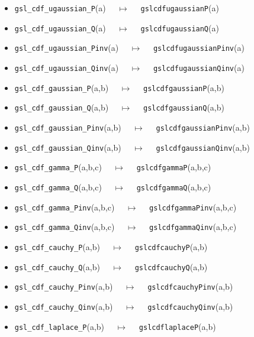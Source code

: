 \documentclass[a4paper,twoside,12pt]{book}
\begin{document}
{\small

\begin{itemize}
    \setlength{\itemsep}{0pt}%
    \setlength{\topsep}{0pt} 
    \setlength{\partopsep}{0pt}
    \setlength{\parsep}{0pt}
    \setlength{\parskip}{0pt}%

\item \texttt{gsl\_cdf\_ugaussian\_P}(a) $\quad \mapsto\quad $ \texttt{gslcdfugaussianP}(a) 
\item \texttt{gsl\_cdf\_ugaussian\_Q}(a) $\quad \mapsto\quad $ \texttt{gslcdfugaussianQ}(a) 
\item \texttt{gsl\_cdf\_ugaussian\_Pinv}(a) $\quad \mapsto\quad $ \texttt{gslcdfugaussianPinv}(a) 
\item \texttt{gsl\_cdf\_ugaussian\_Qinv}(a) $\quad \mapsto\quad $ \texttt{gslcdfugaussianQinv}(a) 
\item \texttt{gsl\_cdf\_gaussian\_P}(a,b) $\quad \mapsto\quad $ \texttt{gslcdfgaussianP}(a,b) 
\item \texttt{gsl\_cdf\_gaussian\_Q}(a,b) $\quad \mapsto\quad $ \texttt{gslcdfgaussianQ}(a,b) 
\item \texttt{gsl\_cdf\_gaussian\_Pinv}(a,b) $\quad \mapsto\quad $ \texttt{gslcdfgaussianPinv}(a,b) 
\item \texttt{gsl\_cdf\_gaussian\_Qinv}(a,b) $\quad \mapsto\quad $ \texttt{gslcdfgaussianQinv}(a,b) 
\item \texttt{gsl\_cdf\_gamma\_P}(a,b,c) $\quad \mapsto\quad $ \texttt{gslcdfgammaP}(a,b,c) 
\item \texttt{gsl\_cdf\_gamma\_Q}(a,b,c) $\quad \mapsto\quad $ \texttt{gslcdfgammaQ}(a,b,c) 
\item \texttt{gsl\_cdf\_gamma\_Pinv}(a,b,c) $\quad \mapsto\quad $ \texttt{gslcdfgammaPinv}(a,b,c) 
\item \texttt{gsl\_cdf\_gamma\_Qinv}(a,b,c) $\quad \mapsto\quad $ \texttt{gslcdfgammaQinv}(a,b,c) 
\item \texttt{gsl\_cdf\_cauchy\_P}(a,b) $\quad \mapsto\quad $ \texttt{gslcdfcauchyP}(a,b) 
\item \texttt{gsl\_cdf\_cauchy\_Q}(a,b) $\quad \mapsto\quad $ \texttt{gslcdfcauchyQ}(a,b) 
\item \texttt{gsl\_cdf\_cauchy\_Pinv}(a,b) $\quad \mapsto\quad $ \texttt{gslcdfcauchyPinv}(a,b) 
\item \texttt{gsl\_cdf\_cauchy\_Qinv}(a,b) $\quad \mapsto\quad $ \texttt{gslcdfcauchyQinv}(a,b) 
\item \texttt{gsl\_cdf\_laplace\_P}(a,b) $\quad \mapsto\quad $ \texttt{gslcdflaplaceP}(a,b) 

\end{itemize}}
\end{document}
